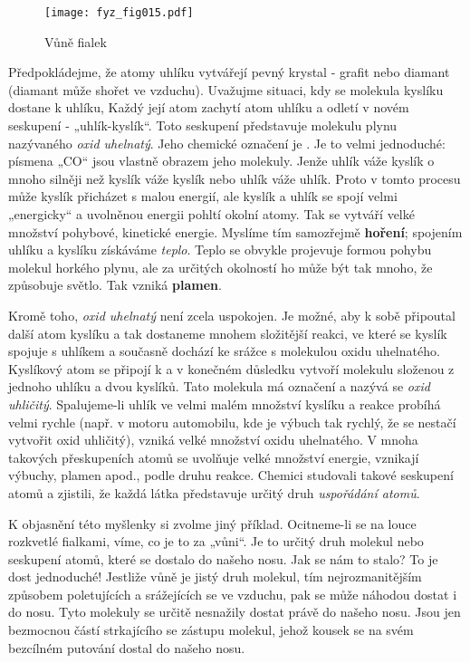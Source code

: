 {      \begin{wrapfigure}[12]{r}{5.0cm}   %
        \centering
        \texttt{[image: fyz\_fig015.pdf]}
        \caption{Vůně fialek \cite[s.~24]{Feynman01}}
        \label{fyz:fig_015}
      \end{wrapfigure}
      Předpokládejme, že atomy uhlíku vytvářejí pevný krystal - grafit nebo diamant (diamant může 
      shořet ve vzduchu). Uvažujme situaci, kdy se molekula kyslíku dostane k uhlíku, Každý její 
      atom zachytí atom uhlíku a odletí v novém seskupení - „uhlík-kyslík“. Toto seskupení 
      představuje molekulu plynu nazývaného \emph{oxid uhelnatý}. Jeho chemické označení je 
      . Je to velmi jednoduché: písmena „CO“ jsou vlastně obrazem jeho molekuly. Jenže 
      uhlík váže kyslík o mnoho silněji než kyslík váže kyslík nebo uhlík váže uhlík. Proto v tomto 
      procesu může kyslík přicházet s malou energií, ale kyslík a uhlík se spojí velmi „energicky“ 
      a uvolněnou energii pohltí okolní atomy. Tak se vytváří velké množství pohybové, kinetické 
      energie. Myslíme tím samozřejmě \textbf{hoření}; spojením uhlíku a kyslíku získáváme 
      \emph{teplo}. Teplo se obvykle projevuje formou pohybu molekul horkého plynu, ale za určitých 
      okolností ho může být tak mnoho, že způsobuje světlo. Tak vzniká \textbf{plamen}.
      
      Kromě toho, \emph{oxid uhelnatý} není zcela uspokojen. Je možné, aby k sobě připoutal další 
      atom kyslíku a tak dostaneme mnohem složitější reakci, ve které se kyslík spojuje s uhlíkem a 
      současně dochází ke srážce s molekulou oxidu uhelnatého. Kyslíkový atom se připojí k  
      a v konečném důsledku vytvoří molekulu složenou z jednoho uhlíku a dvou kyslíků. Tato 
      molekula má označení  a nazývá se \emph{oxid uhličitý}. Spalujeme-li uhlík ve velmi 
      malém množství kyslíku a reakce probíhá velmi rychle (např. v motoru automobilu, kde je 
      výbuch tak rychlý, že se nestačí vytvořit oxid uhličitý), vzniká velké množství oxidu 
      uhelnatého. V mnoha takových přeskupeních atomů se uvolňuje velké množství energie, vznikají 
      výbuchy, plamen apod., podle druhu reakce. Chemici studovali takové seskupení atomů a 
      zjistili, že každá látka představuje určitý druh \emph{uspořádání atomů}.

      K objasnění této myšlenky si zvolme jiný příklad. Ocitneme-li se na louce rozkvetlé fialkami, 
      víme, co je to za „vůni“. Je to určitý druh molekul nebo seskupení atomů, které se dostalo do 
      našeho nosu. Jak se nám to stalo? To je dost jednoduché! Jestliže vůně je jistý druh molekul, 
      tím nejrozmanitějším způsobem poletujících a srážejících se ve vzduchu, pak se může náhodou 
      dostat i do nosu. Tyto molekuly se určitě nesnažily dostat právě do našeho nosu. Jsou jen 
      bezmocnou částí strkajícího se zástupu molekul, jehož kousek se na svém bezcílném putování 
      dostal do našeho nosu.      
      
}
